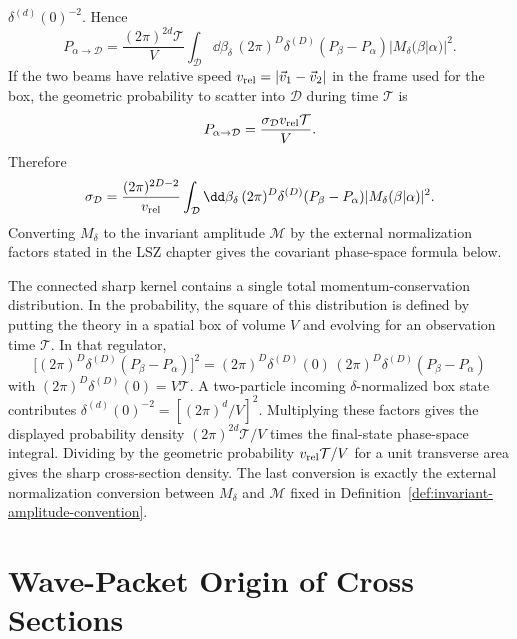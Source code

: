 \begin{example}
\(\delta^{(d)}(0)^{-2}\).  Hence
\[
  P_{\alpha\to\mathcal D}
  =
  \frac{(2\pi)^{2d}\mathcal T}{V}
  \int_{\mathcal D}\dd\beta_\delta\,
  (2\pi)^D\delta^{(D)}(P_\beta-P_\alpha)
  |M_\delta(\beta|\alpha)|^2 .
\]
If the two beams have relative speed \(v_{\rm rel}=|\vec v_1-\vec v_2|\) in
the frame used for the box, the geometric probability to scatter into
\(\mathcal D\) during time \(\mathcal T\) is
\[
  P_{\alpha\to\mathcal D}
  =
  \frac{\sigma_{\mathcal D}v_{\rm rel}\mathcal T}{V}.
\]
Therefore
\[
  \sigma_{\mathcal D}
  =
  \frac{(2\pi)^{2D-2}}{v_{\rm rel}}
  \int_{\mathcal D}\dd\beta_\delta\,
  (2\pi)^D\delta^{(D)}(P_\beta-P_\alpha)
  |M_\delta(\beta|\alpha)|^2 .
\]
Converting \(M_\delta\) to the invariant amplitude \(\mathcal M\) by the
external normalization factors stated in the LSZ chapter gives the covariant
phase-space formula below.

The connected sharp kernel contains a single total momentum-conservation
distribution.  In the probability, the square of this distribution is defined
by putting the theory in a spatial box of volume \(V\) and evolving for an
observation time \(\mathcal T\).  In that regulator,
\[
  \bigl[(2\pi)^D\delta^{(D)}(P_\beta-P_\alpha)\bigr]^2
  =
  (2\pi)^D\delta^{(D)}(0)\,
  (2\pi)^D\delta^{(D)}(P_\beta-P_\alpha)
\]
with \((2\pi)^D\delta^{(D)}(0)=V\mathcal T\).  A two-particle incoming
\(\delta\)-normalized box state contributes
\(\delta^{(d)}(0)^{-2}=[(2\pi)^d/V]^2\).  Multiplying these factors gives the
displayed probability density
\((2\pi)^{2d}\mathcal T/V\) times the final-state phase-space integral.
Dividing by the geometric probability
\(v_{\rm rel}\mathcal T/V\) for a unit transverse area gives the sharp
cross-section density.  The last conversion is exactly the external
normalization conversion between \(M_\delta\) and \(\mathcal M\) fixed in
Definition~\ref{def:invariant-amplitude-convention}.
\end{example}

\section{Wave-Packet Origin of Cross Sections}

